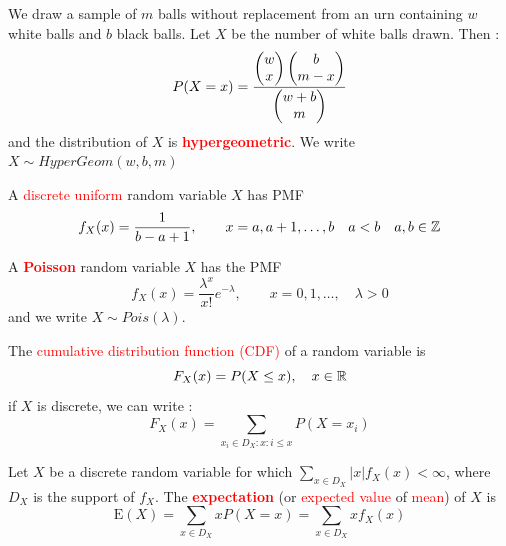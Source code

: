 \documentclass[12pt,a4paper]{article}
\newcommand{\E}{\ensuremath{\mathrm{E}}}
\begin{document}
\begin{boite}
     We draw a sample of $m$ balls without replacement from an urn containing $w$ white balls and $b$ black balls. Let $X$ be the number of white balls drawn. Then :
    \begin{equation}
        P(X=x) = \frac{\begin{pmatrix} w \\ x \end{pmatrix}\begin{pmatrix} b \\ m-x \end{pmatrix}}{\begin{pmatrix} w+b \\ m \end{pmatrix}}
        \label{equ:distribution_hypergeometric}
    \end{equation}
    and the distribution of $X$ is \textbf{\textcolor{red}{hypergeometric}}. We write $X \sim HyperGeom(w,b,m)$
\end{boite}
 A \textcolor{red}{discrete uniform} random variable $X$ has PMF 
\begin{equation}
    f_X(x) = \frac{1}{b-a+1}, \qquad x = a, a+1,\ldots, b\quad a < b \quad a,b \in \mathbb{Z}
    \label{equ:distribution_discrete_uniform}
\end{equation}

\begin{boite}
     A \textbf{\textcolor{red}{Poisson}} random variable $X$ has the PMF
    \begin{equation}
        f_X(x) = \frac{\lambda^x}{x!}e^{-\lambda},\qquad x = 0,1,\ldots,\quad \lambda > 0
        \label{equ:distribution_poisson}
    \end{equation}
    and we write $X \sim Pois(\lambda)$.
\end{boite}

 The \textcolor{red}{cumulative distribution function (CDF)} of a random variable is 
\[F_X(x) = P(X \leq x),\quad x \in \mathbb{R}\]
if $X$ is discrete, we can write :
\[F_X(x) = \sum_{x_i \in D_X:x:i \leq x} P(X = x_i)\]

Let $X$ be a discrete random variable for which $\sum_{x\in D_X} |x|f_X(x) < \infty$, where $D_X$ is the support of $f_X$. The \textbf{\textcolor{red}{expectation}} (or \textcolor{red}{expected value} of \textcolor{red}{mean}) of $X$ is
\begin{equation}
    \E(X) = \sum_{x\in D_X} xP(X=x) = \sum_{x\in D_X} xf_X(x)
    \label{equ:expectation}
\end{equation}
\end{document}
